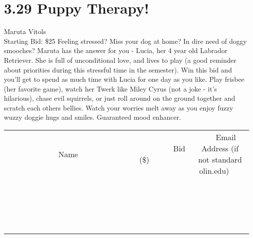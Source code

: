 \documentclass[11pt]{article}
\begin{document}
\section*{3.29 Puppy Therapy!}
Maruta Vitols
\\
Starting Bid: \$25
\newline
Feeling stressed? Miss your dog at home? In dire need of doggy smooches? Maruta has the answer for you - Lucia, her 4 year old Labrador Retriever. She is full of unconditional love, and lives to play (a good reminder about priorities during this stressful time in the semester). Win this bid and you'll get to spend as much time with Lucia for one day as you like. Play frisbee (her favorite game), watch her Twerk like Miley Cyrus (not a joke - it's hilarious), chase evil squirrels, or just roll around on the ground together and scratch each others bellies. Watch your worries melt away as you enjoy fuzzy wuzzy doggie hugs and smiles. Guaranteed mood enhancer.
\\[3ex]
\begin{tabular}{c c c}
~~~~~~~~~~~~~Name~~~~~~~~~~~~~ & ~~~~~~~~~Bid (\$)~~~~~~~~~  & ~~~Email Address (if not standard olin.edu)~~~\\
 & & \\
\hline
 & & \\
\hline
 & & \\
\hline
 & & \\
\hline
 & & \\
\hline
 & & \\
\hline
 & & \\
\hline
 & & \\
\hline
 & & \\
\hline
 & & \\
\hline
 & & \\
\hline
 & & \\
\hline
 & & \\
\hline
 & & \\
\hline
 & & \\
\hline
 & & \\
\hline
 & & \\
\hline
 & & \\
\hline
 & & \\
\hline
\end{tabular}
\newpage
\end{document}
